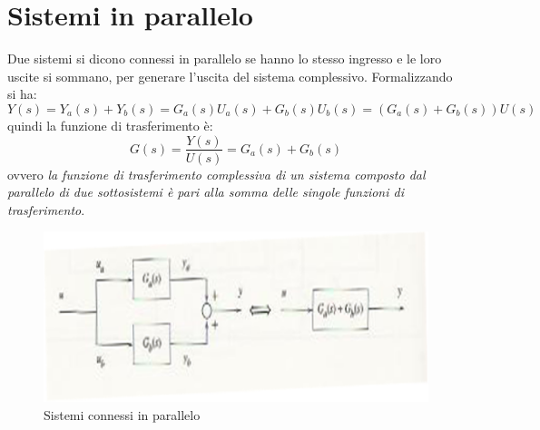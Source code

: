\documentclass[a4paper]{report}
\begin{document}
\section{Sistemi in parallelo}
Due sistemi si dicono connessi in parallelo se hanno lo stesso
ingresso e le loro uscite si sommano, per generare l'uscita del
sistema complessivo. Formalizzando si ha:
\begin{equation}
  Y(s) = Y_a(s) + Y_b(s) = G_a(s)U_a(s) + G_b(s)U_b(s) = (G_a(s) + G_b(s))U(s)
\end{equation}
quindi la funzione di trasferimento \`e:
\begin{equation}
  G(s) = \dfrac{Y(s)}{U(s)} = G_a(s) + G_b(s)
\end{equation}
ovvero \emph{la funzione di trasferimento complessiva di un sistema
  composto dal parallelo di due sottosistemi \`e pari alla somma
  delle singole funzioni di trasferimento}.
\begin{figure}[!hbp]
  \begin{center}
    \includegraphics[scale=0.5]{./figures/parallelo.png}
    \caption{Sistemi connessi in parallelo}\label{fig:sysparal}
  \end{center}
\end{figure} 
\end{document}
